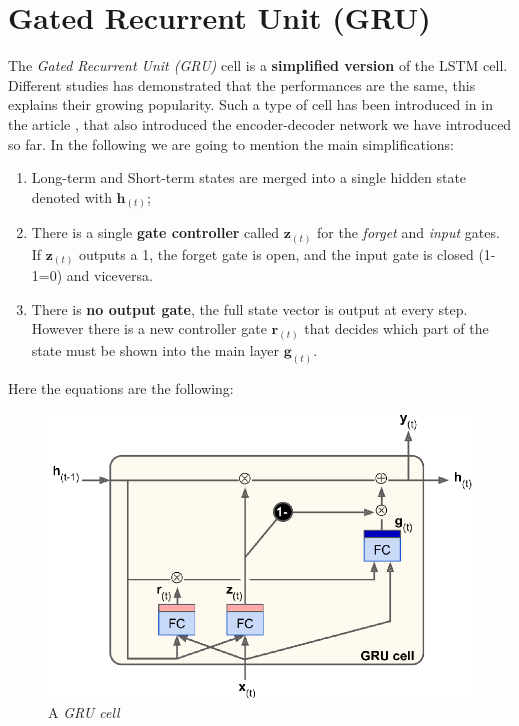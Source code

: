 \section{Gated Recurrent Unit (GRU)}
The \textit{Gated Recurrent Unit (GRU)} cell is a \textbf{simplified version} of the LSTM cell. Different studies has demonstrated that the performances are the same, this explains their growing popularity. 
Such a type of cell has been introduced in  in the article \textit{}, that also introduced the encoder-decoder network we have introduced so far. In the following we are going to mention the main simplifications:
\begin{enumerate}
    \item Long-term and Short-term states are merged into a single hidden state denoted with $\mathbf{h}_{(t)}$; 
    \item There is a single  \textbf{gate controller} called $\mathbf{z}_{(t)}$ for the \textit{forget} and \textit{input} gates. If $\mathbf{z}_{(t)}$ outputs a 1, the forget gate is open, and the input gate is closed (1-1=0) and viceversa.
    \item There is \textbf{no output gate}, the full state vector is output at every step. However there is a new controller gate $\mathbf{r}_{(t)}$ that decides which part of the state must be shown into the main layer $\mathbf{g}_{(t)}$.
\end{enumerate}
Here the equations are the following: 
\vspace{-0.5cm}
\begin{figure}[H]
    \centering
    \includegraphics[scale=0.6]{img/GRU_cell.png} 
    \caption{A \textit{GRU cell}}
\end{figure}
